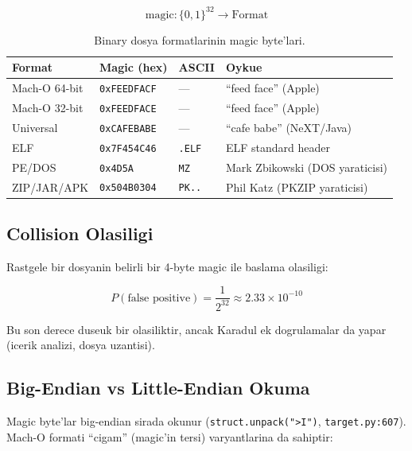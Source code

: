 \documentclass[12pt,a4paper,oneside]{book}
\theoremstyle{definition}
\newcommand{\code}[1]{\texttt{\color{green!60!white}#1}}
\newcommand{\file}[1]{\texttt{\color{yellow!70!white}#1}}
\newcommand{\prob}[1]{P\!\left(#1\right)}
\begin{document}
\begin{equation}
\text{magic}: \{0, 1\}^{32} \to \text{Format}
\end{equation}

\begin{table}[h]
\centering
\begin{tabular}{llll}
\toprule
\textbf{\color{sectioncyan}Format} & \textbf{\color{sectioncyan}Magic (hex)} & \textbf{\color{sectioncyan}ASCII} & \textbf{\color{sectioncyan}Oykue} \\
\midrule
Mach-O 64-bit & \code{0xFEEDFACF} & --- & ``feed face'' (Apple) \\
Mach-O 32-bit & \code{0xFEEDFACE} & --- & ``feed face'' (Apple) \\
Universal & \code{0xCAFEBABE} & --- & ``cafe babe'' (NeXT/Java) \\
ELF & \code{0x7F454C46} & \code{.ELF} & ELF standard header \\
PE/DOS & \code{0x4D5A} & \code{MZ} & Mark Zbikowski (DOS yaraticisi) \\
ZIP/JAR/APK & \code{0x504B0304} & \code{PK..} & Phil Katz (PKZIP yaraticisi) \\
\bottomrule
\end{tabular}
\caption{Binary dosya formatlarinin magic byte'lari.}
\label{tab:magic}
\end{table}

\subsection{Collision Olasiligi}

Rastgele bir dosyanin belirli bir 4-byte magic ile basla\-ma olasiligi:

\begin{equation}
\prob{\text{false positive}} = \frac{1}{2^{32}} \approx 2.33 \times 10^{-10}
\end{equation}

Bu son derece duseuk bir olasiliktir, ancak Karadul ek dogrulamalar da yapar (icerik analizi, dosya uzantisi).

\subsection{Big-Endian vs Little-Endian Okuma}

Magic byte'lar big-endian sirada okunur (\code{struct.unpack(">I")}, \file{target.py:607}). Mach-O formati ``cigam'' (magic'in tersi) varyantlarina da sahiptir:
\end{document}
